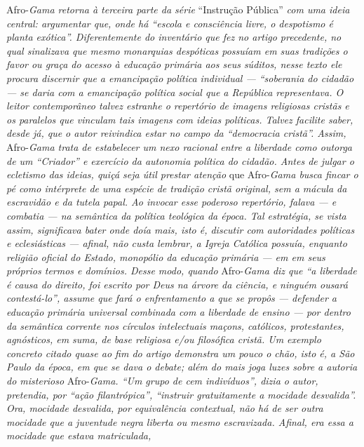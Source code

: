 \begin{didascalia}
Afro-\emph{Gama retorna à terceira parte da série} ``Instrução Pública''
\emph{com uma ideia central: argumentar que, onde há ``escola e
consciência livre, o despotismo é planta exótica''. Diferentemente do
inventário que fez no artigo precedente, no qual sinalizava que mesmo
monarquias despóticas possuíam em suas tradições o favor ou graça do
acesso à educação primária aos seus súditos, nesse texto ele procura
discernir que a emancipação política individual --- ``soberania do cidadão
--- se daria com a emancipação política social que a República
representava. O leitor contemporâneo talvez estranhe o repertório de
imagens religiosas cristãs e os paralelos que vinculam tais imagens com
ideias políticas. Talvez facilite saber, desde já, que o autor
reivindica estar no campo da ``democracia cristã''. Assim,} Afro-\emph{Gama trata de estabelecer um nexo racional entre a liberdade
como outorga de um ``Criador'' e exercício da autonomia política do
cidadão. Antes de julgar o ecletismo das ideias, quiçá seja útil prestar
atenção} que Afro-\emph{Gama busca fincar o pé como intérprete de uma
espécie de tradição cristã original, sem a mácula da escravidão e da
tutela papal. Ao invocar esse poderoso repertório, falava --- e combatia
--- na semântica da política teológica da época. Tal estratégia, se vista
assim, significava bater onde doía mais, isto é, discutir com
autoridades políticas e eclesiásticas --- afinal, não custa lembrar, a
Igreja Católica possuía, enquanto religião oficial do Estado, monopólio
da educação primária --- em em seus próprios termos e domínios. Desse
modo, quando} Afro-\emph{Gama diz que ``a liberdade é causa do
direito, foi escrito por Deus na árvore da ciência, e ninguém ousará
contestá-lo'', assume que fará o enfrentamento a que se propôs ---
defender a educação primária universal combinada com a liberdade de
ensino --- por dentro da semântica corrente nos círculos intelectuais
maçons, católicos, protestantes, agnósticos, em suma, de base religiosa
e/ou filosófica cristã. Um exemplo concreto citado quase ao fim do
artigo demonstra um pouco o chão, isto é, a São Paulo da época, em que
se dava o debate; além do mais joga luzes sobre a autoria do misterioso}
Afro-\emph{Gama. ``Um grupo de cem indivíduos'', dizia o autor,
pretendia, por ``ação filantrópica'', ``instruir gratuitamente a mocidade
desvalida''. Ora, mocidade desvalida, por equivalência contextual, não há
de ser outra mocidade que a juventude negra liberta ou mesmo
escravizada. Afinal, era essa a mocidade que estava matriculada,
}
\end{didascalia}
